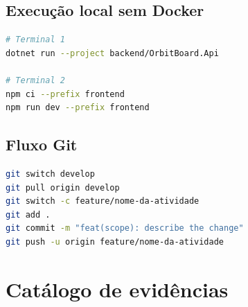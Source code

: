 \documentclass[12pt,a4paper,openany]{report}
\begin{document}
\section{Execução local sem Docker}

\begin{lstlisting}[language=bash]
# Terminal 1
dotnet run --project backend/OrbitBoard.Api

# Terminal 2
npm ci --prefix frontend
npm run dev --prefix frontend
\end{lstlisting}

\section{Fluxo Git}

\begin{lstlisting}[language=bash]
git switch develop
git pull origin develop
git switch -c feature/nome-da-atividade
git add .
git commit -m "feat(scope): describe the change"
git push -u origin feature/nome-da-atividade
\end{lstlisting}

\chapter{Catálogo de evidências}
\end{document}
